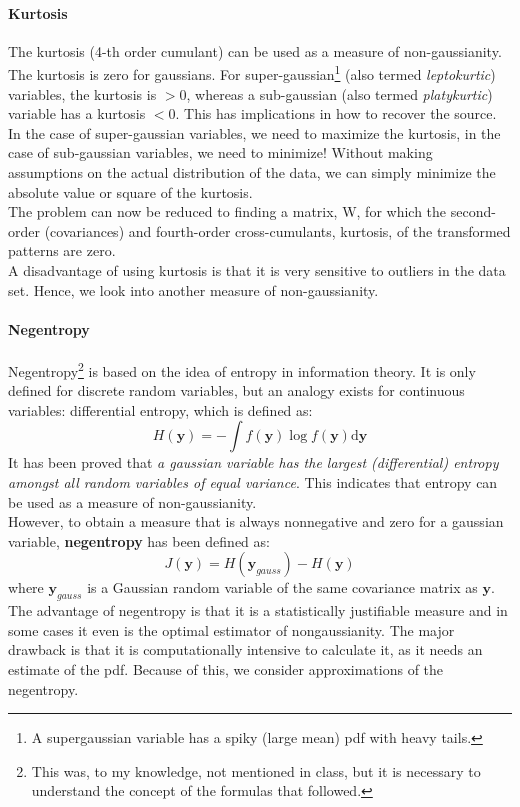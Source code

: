 \documentclass[11pt]{article}
\begin{document}
\paragraph{Kurtosis} The kurtosis (4-th order cumulant) can be used as a measure of non-gaussianity.
The kurtosis is zero for gaussians. For super-gaussian\footnote{A supergaussian variable has a spiky (large mean) pdf with heavy tails.} (also termed \textit{leptokurtic}) variables, the kurtosis is $ > 0$, whereas a sub-gaussian (also termed \textit{platykurtic}) variable has a kurtosis $< 0$. This has implications in how to recover the source. In the case of super-gaussian variables, we need to maximize the kurtosis, in the case of sub-gaussian variables, we need to minimize! Without making assumptions on the actual distribution of the data, we can simply minimize the absolute value or square of the kurtosis.\\
The problem can now be reduced to finding a matrix, W, for which the second-order (covariances) and fourth-order cross-cumulants, kurtosis, of the transformed patterns are zero.\\
A disadvantage of using kurtosis is that it is very sensitive to outliers in the data set. Hence, we look into another measure of non-gaussianity.
\paragraph{Negentropy} Negentropy\footnote{This was, to my knowledge, not mentioned in class, but it is necessary to understand the concept of the formulas that followed.} is based on the idea of entropy in information theory. It is only defined for discrete random variables, but an analogy exists for continuous variables: differential entropy, which is defined as:
\[ H(\mathbf{y}) = -\int f(\mathbf{y}) \log f(\mathbf{y}) \mathrm{d}\mathbf{y} \]
It has been proved that \textit{a gaussian variable has the largest (differential) entropy amongst all random variables of equal variance}. This indicates that entropy can be used as a measure of non-gaussianity.\\
However, to obtain a measure that is always nonnegative and zero for a gaussian variable, \textbf{negentropy} has been defined as:
\[J(\mathbf{y}) = H(\mathbf{y}_{gauss}) - H(\mathbf{y})\]
where $\mathbf{y}_{gauss}$ is a Gaussian random variable of the same covariance matrix as $\mathbf{y}$.\\
The advantage of negentropy is that it is a statistically justifiable measure and in some cases it even is the optimal estimator of nongaussianity. The major drawback is that it is computationally intensive to calculate it, as it needs an estimate of the pdf. Because of this, we consider approximations of the negentropy.
\end{document}
